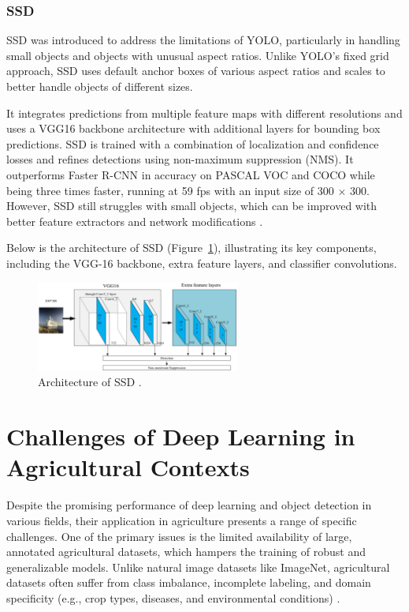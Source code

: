 \subsubsection{SSD}
SSD was introduced to address the limitations of YOLO, particularly in handling small objects and objects with unusual aspect ratios. Unlike YOLO's fixed grid approach, SSD uses default anchor boxes of various aspect ratios and scales to better handle objects of different sizes.

It integrates predictions from multiple feature maps with different resolutions and uses a VGG16 backbone architecture with additional layers for bounding box predictions. SSD is trained with a combination of localization and confidence losses and refines detections using non-maximum suppression (NMS). It outperforms Faster R-CNN in accuracy on PASCAL VOC and COCO while being three times faster, running at 59 fps with an input size of 300 × 300. However, SSD still struggles with small objects, which can be improved with better feature extractors and network modifications \parencite{zhao2019objectdetection}.

Below is the architecture of SSD (Figure~\ref{fig:figure19}), illustrating its key components, including the VGG-16 backbone, extra feature layers, and classifier convolutions.

\begin{figure}[H] %
    \centering
    \includegraphics[width=0.6\textwidth]{chapters/chapter1/images/Figure19.png}
    \caption{Architecture of SSD \parencite{li2021water}.}
    \label{fig:figure19}
\end{figure}

\section{Challenges of Deep Learning in Agricultural Contexts}

Despite the promising performance of deep learning and object detection in various fields, their application in agriculture presents a range of specific challenges. One of the primary issues is the limited availability of large, annotated agricultural datasets, which hampers the training of robust and generalizable models. Unlike natural image datasets like ImageNet, agricultural datasets often suffer from class imbalance, incomplete labeling, and domain specificity (e.g., crop types, diseases, and environmental conditions) \parencite{alzubaidi2021review}.

